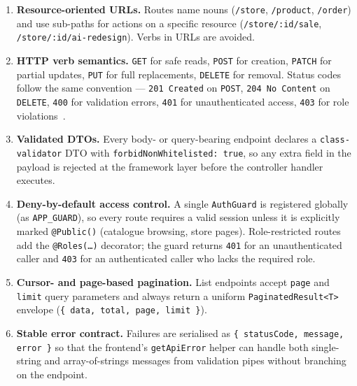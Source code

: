\documentclass[12pt, a4paper, oneside]{report}
\begin{document}
\begin{enumerate}[leftmargin=*,itemsep=2pt]
  \item \textbf{Resource-oriented URLs.} Routes name nouns
        (\texttt{/store}, \texttt{/product}, \texttt{/order})
        and use sub-paths for actions on a specific resource
        (\texttt{/store/:id/sale},
        \texttt{/store/:id/ai-redesign}). Verbs in URLs are
        avoided.
  \item \textbf{HTTP verb semantics.} \texttt{GET} for safe
        reads, \texttt{POST} for creation, \texttt{PATCH} for
        partial updates, \texttt{PUT} for full replacements,
        \texttt{DELETE} for removal. Status codes follow the
        same convention --- \texttt{201 Created} on
        \texttt{POST}, \texttt{204 No Content} on
        \texttt{DELETE}, \texttt{400} for validation errors,
        \texttt{401} for unauthenticated access, \texttt{403}
        for role violations~\cite{mdn}.
  \item \textbf{Validated DTOs.} Every body- or query-bearing
        endpoint declares a \texttt{class-validator} DTO with
        \texttt{forbidNonWhitelisted: true}, so any extra field
        in the payload is rejected at the framework layer
        before the controller handler executes.
  \item \textbf{Deny-by-default access control.} A single
        \texttt{AuthGuard} is registered globally (as
        \texttt{APP\_GUARD}), so every route requires a valid
        session unless it is explicitly marked \texttt{@Public()}
        (catalogue browsing, store pages). Role-restricted routes
        add the \texttt{@Roles(\ldots)} decorator; the guard
        returns \texttt{401} for an unauthenticated caller and
        \texttt{403} for an authenticated caller who lacks the
        required role.
  \item \textbf{Cursor- and page-based pagination.} List
        endpoints accept \texttt{page} and \texttt{limit} query
        parameters and always return a uniform
        \texttt{PaginatedResult<T>} envelope
        (\texttt{\{ data, total, page, limit \}}).
  \item \textbf{Stable error contract.} Failures are
        serialised as
        \texttt{\{ statusCode, message, error \}} so that the
        frontend's \texttt{getApiError} helper can handle both
        single-string and array-of-strings messages from
        validation pipes without branching on the endpoint.
\end{enumerate}
\end{document}
